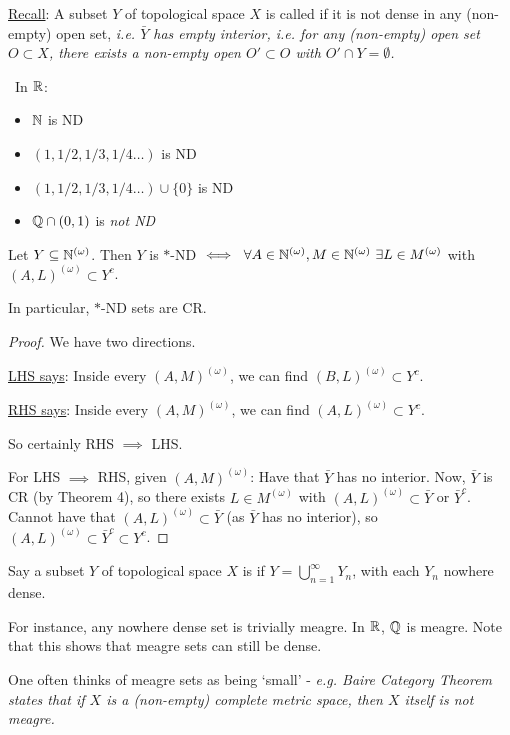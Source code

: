 \documentclass[10pt]{article}
\newcommand{\bom}{{(\omega)}}
\begin{document}
\underline{Recall}: A subset $Y$ of topological space $X$ is called  if it is not dense in any (non-empty) open set, \it{i.e.} $\bar{Y}$ has empty interior, \it{i.e.} for any (non-empty) open set $O\subset X$, there exists a non-empty open $O'\subset O$ with $O' \cap Y = \emptyset$.

\begin{remark*}[Examples]\
    In $\mathbb{R}$: 
    \begin{itemize}
        \item $\mathbb{N}$ is ND
        \item $(1,1/2,1/3,1/4\dots)$  is ND
        \item $(1,1/2,1/3,1/4\dots)\cup\{0\}$ is ND
        \item $\mathbb{Q} \cap (0,1)$ is \it{not} ND
    \end{itemize}
\end{remark*}

\begin{prop}
    Let $Y\subset \N^\bom$. Then $Y$ is $\ast$-ND $\iff\ \forall A \in \N^\bom,M\in\N^\bom\ \exists L\in M^\bom$ with $(A,L)^\bom\subset Y^c$.

    In particular, $\ast$-ND sets are CR.
\end{prop}
\begin{proof} We have two directions.

    \underline{LHS says}: Inside every $(A,M)^\bom$, we can find $(B,L)^\bom\subset Y^c$.

    \underline{RHS says}: Inside every $(A,M)^\bom$, we can find $(A,L)^\bom\subset Y^c$.

    So certainly RHS $\implies$ LHS.

    For LHS $\implies$ RHS, given $(A,M)^\bom$: Have that $\bar{Y}$ has no interior. Now, $\bar{Y}$ is CR (by Theorem 4), so there exists $L \in M^\bom$ with $(A,L)^\bom \subset \bar{Y}$ or $\bar{Y}^c$. Cannot have that $(A,L)^\bom\subset \bar{Y}$ (as $\bar{Y}$ has no interior), so $(A,L)^\bom \subset \bar{Y}^c \subset Y^c$.
\end{proof}

Say a subset $Y$ of topological space $X$ is  if $Y = \bigcup_{n=1}^{\infty} Y_n$, with each $Y_n$ nowhere dense.

For instance, any nowhere dense set is trivially meagre. In $\mathbb{R}$, $\mathbb{Q}$ is meagre. Note that this shows that meagre sets can still be dense.

One often thinks of meagre sets as being `small' - \it{e.g.} Baire Category Theorem states that if $X$ is a (non-empty) complete metric space, then $X$ itself is not meagre.
\end{document}
